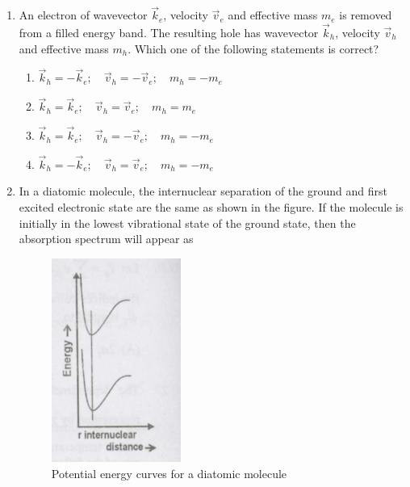 \documentclass[14pt, a4paper]{extarticle}
\begin{document}
\begin{enumerate}[label=\textbf{Q. \arabic*}, start=21]
\item An electron of wavevector $\vec{k}_e$, velocity $\vec{v}_e$ and effective mass $m_e$ is removed from a filled energy band. The resulting hole has wavevector $\vec{k}_h$, velocity $\vec{v}_h$ and effective mass $m_h$. Which one of the following statements is correct?
\begin{enumerate}
\item $\vec{k}_h = -\vec{k}_e; \quad \vec{v}_h = -\vec{v}_e; \quad m_h = -m_e$
\item $\vec{k}_h = \vec{k}_e; \quad \vec{v}_h = \vec{v}_e; \quad m_h = m_e$
\item $\vec{k}_h = \vec{k}_e; \quad \vec{v}_h = -\vec{v}_e; \quad m_h = -m_e$
\item $\vec{k}_h = -\vec{k}_e; \quad \vec{v}_h = \vec{v}_e; \quad m_h = -m_e$
\end{enumerate}

\vspace{24em}

\item In a diatomic molecule, the internuclear separation of the ground and first excited electronic state are the same as shown in the figure.
If the molecule is initially in the lowest vibrational state of the ground state, then the absorption spectrum will appear as
\begin{figure}[H]
\centering
\includegraphics[width=0.4\textwidth]{figs/Q30fig1.png}
\caption{Potential energy curves for a diatomic molecule}
\label{fig:q30_main}
\end{figure}
\begin{enumerate}
\end{enumerate}
\end{enumerate}
\end{document}
